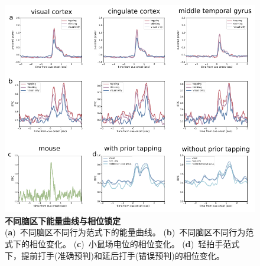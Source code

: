 \begin{figure}[h]
    \centering
    \includegraphics[width=\textwidth]{src/figures/ephys_network.pdf}
    \caption{\textbf{不同脑区下能量曲线与相位锁定}\\
    (\textbf{a})~不同脑区不同行为范式下的能量曲线。
    (\textbf{b})~不同脑区不同行为范式下的相位变化。
    (\textbf{c})~小鼠场电位的相位变化。
    (\textbf{d})~轻拍手范式下，提前打手(准确预判)和延后打手(错误预判)的相位变化。}
    \label{fig:ephys_network}
\end{figure}

